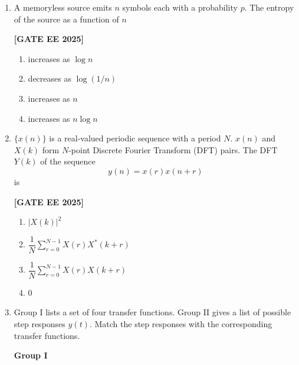 \documentclass[12pt]{article}
\begin{document}
\begin{enumerate}[leftmargin=*, label=\textbf{Q.\arabic*:}]
\noindent \textbf{[GATE EE 2025]}
\begin{multicols}{2}
\begin{enumerate}
  \item (P1, R1), (P2, R3), (P3, R4)
  \item (P1, R2), (P2, R3), (P3, R4)
  \item (P1, R3), (P2, R1), (P3, R2)
  \item (P1, R1), (P2, R2), (P3, R3)
\end{enumerate}
\end{multicols}

\item A memoryless source emits $n$ symbols each with a probability $p$. The entropy of the source as a function of $n$
 
\noindent \textbf{[GATE EE 2025]}
\begin{multicols}{2}
\begin{enumerate}
  \item increases as $\log n$
  \item decreases as $\log(1/n)$
  \item increases as $n$
  \item increases as $n \log n$
\end{enumerate}
\end{multicols}

\item $\{x(n)\}$ is a real-valued periodic sequence with a period $N$. $x(n)$ and $X(k)$ form $N$-point Discrete Fourier Transform (DFT) pairs. The DFT $Y(k)$ of the sequence
\[
y(n) = x(r) x(n + r)
\]
is
 
\noindent \textbf{[GATE EE 2025]}
\begin{multicols}{2}
\begin{enumerate}
  \item $|X(k)|^2 $
  \item $\dfrac{1}{N} \sum_{r=0}^{N-1} X(r) X^*(k+r) $
  \item $\dfrac{1}{N} \sum_{r=0}^{N-1} X(r) X(k+r) $
  \item $0$
\end{enumerate}
\end{multicols}

\item
Group I lists a set of four transfer functions. Group II gives a list of possible step responses $y(t)$. Match the step responses with the corresponding transfer functions.

\textbf{Group I}


\end{enumerate}
\end{document}
